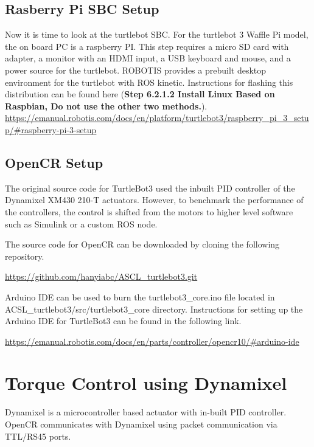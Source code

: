 \documentclass[12]{article}
\begin{document}
\subsection{Rasberry Pi SBC Setup}

Now it is time to look at the turtlebot SBC. For the turtlebot 3 Waffle Pi model, the on board PC is a raspberry PI. This step requires a micro SD card with adapter, a monitor with an HDMI input, a USB keyboard and mouse, and a power source for the turtlebot. ROBOTIS provides a prebuilt desktop environment for the turtlebot with ROS kinetic. Instructions for flashing this distribution can be found here (\textbf{Step 6.2.1.2 Install Linux Based on Raspbian, Do not use the other two methods.}).\\

\url {https://emanual.robotis.com/docs/en/platform/turtlebot3/raspberry_pi_3_setup/#raspberry-pi-3-setup}

\subsection{OpenCR Setup}

The original source code for TurtleBot3 used the inbuilt PID controller of the Dynamixel XM430 210-T actuators. However, to benchmark the performance of the controllers, the control is shifted from the motors to higher level software such as Simulink or a custom ROS node.

The source code for OpenCR can be downloaded by cloning the following repository.

\url {https://github.com/hanyiabc/ASCL_turtlebot3.git}

Arduino IDE can be used to burn the turtlebot3\_core.ino file located in ACSL\_turtlebot3/src/turtlebot3\_core directory. Instructions for setting up the Arduino IDE for TurtleBot3 can be found in the following link.

\url {https://emanual.robotis.com/docs/en/parts/controller/opencr10/#arduino-ide}

\newpage

\section{Torque Control using Dynamixel}
       
Dynamixel is a microcontroller based actuator with in-built PID controller. OpenCR communicates with Dynamixel using packet communication via TTL/RS45 ports. 
\end{document}
